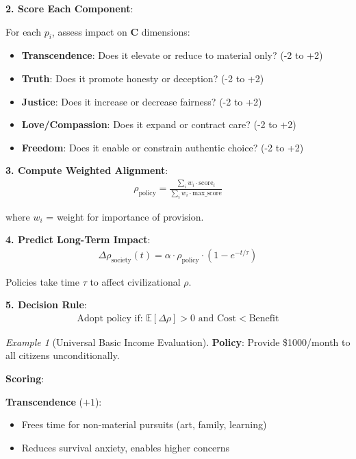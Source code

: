 \documentclass[11pt,a4paper]{article}
\theoremstyle{definition}
\theoremstyle{remark}
\newtheorem{example}{Example}[section]
\begin{document}
\begin{enumerate}
\begin{protocol}
\textbf{2. Score Each Component}:

For each \(p_i\), assess impact on \(\mathbf{C}\) dimensions:
\begin{itemize}
    \item \textbf{Transcendence}: Does it elevate or reduce to material only? (-2 to +2)
    \item \textbf{Truth}: Does it promote honesty or deception? (-2 to +2)
    \item \textbf{Justice}: Does it increase or decrease fairness? (-2 to +2)
    \item \textbf{Love/Compassion}: Does it expand or contract care? (-2 to +2)
    \item \textbf{Freedom}: Does it enable or constrain authentic choice? (-2 to +2)
\end{itemize}

\textbf{3. Compute Weighted Alignment}:
\begin{align}
\rho_{\text{policy}} = \frac{\sum_i w_i \cdot \text{score}_i}{\sum_i w_i \cdot \text{max\_score}}
\end{align}

where \(w_i\) = weight for importance of provision.

\textbf{4. Predict Long-Term Impact}:
\begin{align}
\Delta \rho_{\text{society}}(t) = \alpha \cdot \rho_{\text{policy}} \cdot (1 - e^{-t/\tau})
\end{align}

Policies take time \(\tau\) to affect civilizational \(\rho\).

\textbf{5. Decision Rule}:
\begin{align}
\text{Adopt policy if: } \mathbb{E}[\Delta \rho] > 0 \text{ and } \text{Cost} < \text{Benefit}
\end{align}
\end{protocol}

\begin{example}[Universal Basic Income Evaluation]
\textbf{Policy}: Provide \$1000/month to all citizens unconditionally.

\textbf{Scoring}:

\textbf{Transcendence} (\(+1\)): 
\begin{itemize}
    \item Frees time for non-material pursuits (art, family, learning)
    \item Reduces survival anxiety, enables higher concerns
\end{itemize}


\end{example}
\end{enumerate}
\end{document}
